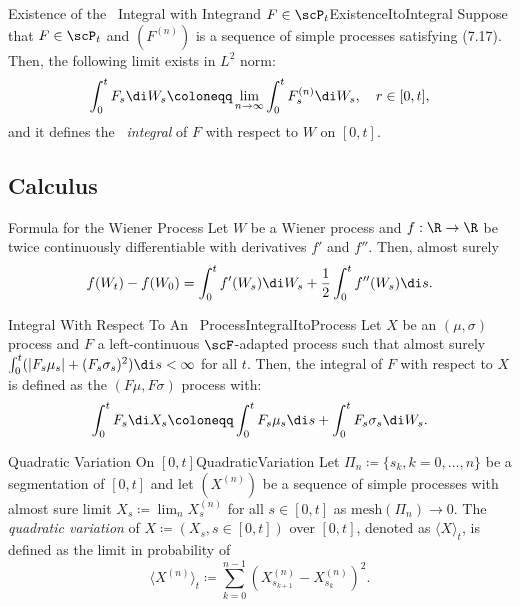\begin{thm}{Existence of the \Ito\ Integral with Integrand $F \in \scP_t$}{ExistenceItoIntegral}
	Suppose that $F \in \scP_t$ and $(F^{(n)})$ is a sequence of simple processes satisfying (7.17). Then, the following limit exists in $L^2$ norm:
	\begin{equation}
		\int_0^t F_s \di W_s \coloneqq \lim_{n \to \infty} \int_0^t F_s^{(n)} \di W_s, \quad r \in [0, t],
		\label{eq:ItoIntegralL2Limit}
	\end{equation}
	and it defines the \textit{\Ito\ integral} of $F$ with respect to $W$ on $[0, t]$.
\end{thm}

\subsection{\Ito{} Calculus}
\begin{thm}{\Ito{} Formula for the Wiener Process}{}
	Let $W$ be a Wiener process and $f : \R \to \R$ be twice continuously differentiable with derivatives $f'$ and $f''$. Then, almost surely
	\begin{equation*}
		f(W_t) - f(W_0) = \int_0^t f'(W_s) \di W_s + \frac{1}{2} \int_0^t f''(W_s) \di s.
	\end{equation*}
\end{thm}

\begin{defn}{Integral With Respect To An \Ito\ Process}{IntegralItoProcess}
	Let $X$ be an \Ito$(\mu, \sigma)$ process and $F$ a left-continuous $\scF$-adapted process such that almost surely $\int_{0}^{t}(|F_s\mu_s| + (F_s\sigma_s)^2)\di s < \infty$ for all $t$. Then, the integral of $F$ with respect to $X$ is defined as the \Ito$(F\mu, F\sigma)$ process with:
	\begin{equation}
		\int_{0}^{t} F_s \di X_s \coloneqq \int_{0}^{t} F_s \mu_s \di s + \int_{0}^{t} F_s \sigma_s \di W_s.
	\end{equation}
\end{defn}

\begin{defn}{Quadratic Variation On $[0, t]$}{QuadraticVariation}
	Let $\Pi_n \coloneqq \{s_k, k = 0, \dots, n\}$ be a segmentation of $[0, t]$ and let $(X^{(n)})$ be a sequence of simple processes with almost sure limit $X_s \coloneqq \lim_n X^{(n)}_s$ for all $s \in [0, t]$ as $\mathrm{mesh}(\Pi_n) \to 0$. The \textit{quadratic variation} of $X \coloneqq (X_s, s \in [0, t])$ over $[0, t]$, denoted as $\langle X \rangle_t$, is defined as the limit in probability of
	\begin{equation}
		\langle X^{(n)} \rangle_t \coloneqq \sum_{k=0}^{n-1} (X^{(n)}_{s_{k+1}} - X^{(n)}_{s_k})^2.
	\end{equation}
\end{defn}

